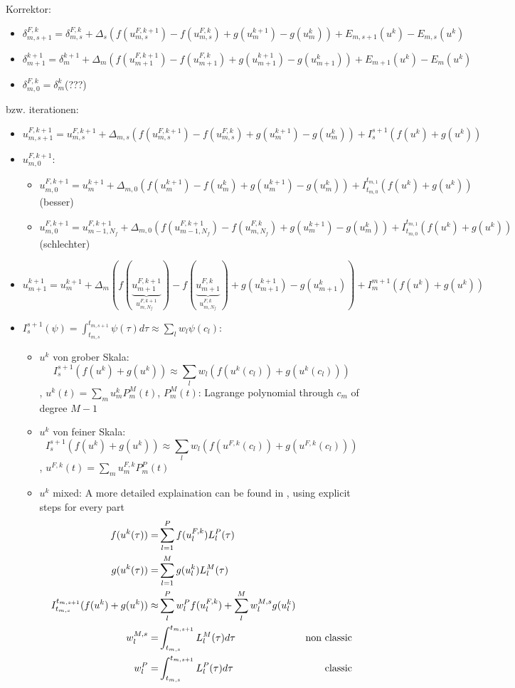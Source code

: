 \documentclass{article}
\begin{document}
 Korrektor:
 \begin{itemize}
  \item $\delta_{m,s+1}^{F,k}=\delta^{F,k}_{m,s}+\Delta_{s}(f(u_{m,s}^{F,k+1})-f(u_{m,s}^{F,k})+g(u_{m}^{k+1})-g(u_m^k))+E_{m,s+1}(u^k)-E_{m,s}(u^k)$
  \item $\delta_{m+1}^{k+1}=\delta_{m}^{k+1}+\Delta_m (f(u_{m+1}^{F,k+1})-f(u_{m+1}^{F,k})+g(u_{m+1}^{k+1})-g(u_{m+1}^k))+E_{m+1}(u^k)-E_{m}(u^k)$
  \item $\delta_{m,0}^{F,k}=\delta_{m}^k$(???)
 \end{itemize}
 bzw. iterationen:
  \begin{itemize}
   \item $u_{m,s+1}^{F,k+1}=u_{m,s}^{F,k+1}+\Delta_{m,s}(f(u_{m,s}^{F,k+1})-f(u_{m,s}^{F,k})+g(u_{m}^{k+1})-g(u_m^k))+I_{s}^{s+1}(f(u^k)+g(u^k))$
   \item $u_{m,0}^{F,k+1}$:
    \begin{itemize}
     \item $u_{m,0}^{F,k+1}=u_{m}^{k+1}+\Delta_{m,0}(f(u_{m}^{k+1})-f(u_{m}^{k})+g(u_{m}^{k+1})-g(u_m^k))+I_{t_{m,0}}^{t_{m,1}}(f(u^k)+g(u^k))$ (besser)
     \item $u_{m,0}^{F,k+1}=u_{m-1,N_f}^{F,k+1}+\Delta_{m,0}(f(u_{m-1,N_f}^{F,k+1})-f(u_{m,N_f}^{F,k})+g(u_{m}^{k+1})-g(u_m^k))+I_{t_{m,0}}^{t_{m,1}}(f(u^k)+g(u^k))$ (schlechter)
    \end{itemize}
   \item $u_{m+1}^{k+1}=u_{m}^{k+1}+\Delta_{m} (f(\underbrace{u^{F,k+1}_{m+1}}_{u^{F,k+1}_{m,N_f}})-f(\underbrace{u^{F,k}_{m+1}}_{u^{F,k}_{m,N_f}})+g(u_{m+1}^{k+1})-g(u_{m+1}^k))+I_{m}^{m+1}(f(u^k)+g(u^k))$
   \item $I_s^{s+1}(\psi)=\int_{t_{m,s}}^{t_{m,s+1}} \psi(\tau) d\tau\approx \sum_l w_l \psi(c_l)$:
    \begin{itemize}
     \item $u^k$ von grober Skala: $$I_{s}^{s+1}(f(u^k)+g(u^k))\approx \sum_l w_l( f(u^k(c_l))+g(u^k(c_l)))$$, $u^k(t)=\sum_m u^k_m P_m^M(t)$, $P_m^M(t)$: Lagrange polynomial through $c_m$ of degree $M-1$
     \item $u^k$ von feiner Skala: $$I_s^{s+1} (f(u^k)+g(u^k))\approx \sum_l w_l (f(u^{F,k}(c_l))+g(u^{F,k}(c_l)))$$, $u^{F,k}(t)=\sum_m u^{F,k}_m P_m^P(t)$
     \item $u^k$ mixed: A more detailed explaination can be found in \cite{bouzarth2010multirate}, using explicit steps for every part
      \begin{align*}
        f(u^k(\tau))=& \sum_{l=1}^P f(u^{F,k}_{l}) L_l^P(\tau) \cr
         g(u^k(\tau))=&\sum_{l=1}^M g(u^{k}_l) L_l^M(\tau) \cr
 	I_{t_{m,s}}^{t_{m,s+1}}(f(u^k)+g(u^k))\approx & \sum_l^P w_l^P f(u^{F,k}_l) + \sum_{l}^M w_l^{M,s} g(u^k_l) \cr
 	w_l^{M,s}=&\int_{t_{m,s}}^{t_{m,s+1}} L_l^{M}(\tau) d\tau &\text{non classic}\cr
 	w_l^{P}=&\int_{t_{m,s}}^{t_{m,s+1}} L_l^P(\tau) d\tau & \text{classic}
      \end{align*}
    \end{itemize}
  \end{itemize}
\end{document}
